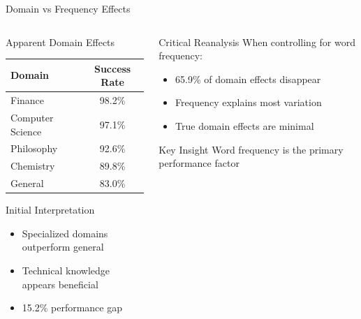 \documentclass[aspectratio=169]{beamer}
\begin{document}
\begin{frame}{Domain vs Frequency Effects}
\begin{columns}[c]
\begin{column}{0.5\textwidth}
\begin{block}{Apparent Domain Effects}
\begin{center}
\begin{tabular}{lc}
\toprule
\textbf{Domain} & \textbf{Success Rate} \\
\midrule
Finance & 98.2\% \\
Computer Science & 97.1\% \\
Philosophy & 92.6\% \\
Chemistry & 89.8\% \\
General & 83.0\% \\
\bottomrule
\end{tabular}
\end{center}
\end{block}

\begin{block}{Initial Interpretation}
\begin{itemize}
    \item Specialized domains outperform general
    \item Technical knowledge appears beneficial
    \item 15.2\% performance gap
\end{itemize}
\end{block}
\end{column}

\begin{column}{0.48\textwidth}
\begin{alertblock}{Critical Reanalysis}
When controlling for word frequency:
\begin{itemize}
    \item 65.9\% of domain effects disappear
    \item Frequency explains most variation
    \item True domain effects are minimal
\end{itemize}
\end{alertblock}

\begin{block}{Key Insight}
Word frequency is the primary performance factor
\end{block}
\end{column}
\end{columns}
\end{frame}
\end{document}
